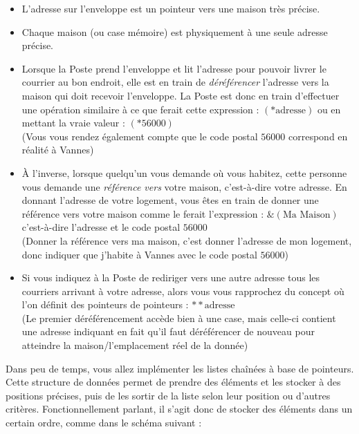 \documentclass[11pt,a4paper]{article}
\begin{document}
\begin{itemize}
\item L'adresse sur l'enveloppe est un pointeur vers une maison très précise. \\

\item Chaque maison (ou case mémoire) est physiquement à une seule adresse précise. \\

\item Lorsque la Poste prend l'enveloppe et lit l'adresse pour pouvoir livrer le courrier au bon endroit, elle est en train de \textit{déréférencer} l'adresse vers la maison qui doit recevoir l'enveloppe.
La Poste est donc en train d'effectuer une opération similaire à ce que ferait cette expression : \underline{$ (*\text{adresse}) $} ou en mettant la vraie valeur : \underline{$ (*56000) $} \\
(Vous vous rendez également compte que le code postal $ 56000 $ correspond en réalité à Vannes) \\

\item À l'inverse, lorsque quelqu'un vous demande où vous habitez, cette personne vous demande une \textit{référence vers} votre maison, c'est-à-dire votre adresse.
En donnant l'adresse de votre logement, vous êtes en train de donner une référence vers votre maison comme le ferait l'expression : \underline{$ \&(\text{Ma Maison}) $} c'est-à-dire l'adresse et le code postal \underline{$ 56000 $} \\
(Donner la référence vers ma maison, c'est donner l'adresse de mon logement, donc indiquer que j'habite à Vannes avec le code postal $ 56000 $) \\

\item Si vous indiquez à la Poste de rediriger vers une autre adresse tous les courriers arrivant à votre adresse, alors vous vous rapprochez du concept où l'on définit des pointeurs de pointeurs : \underline{$ **\text{adresse} $} \\
(Le premier déréférencement accède bien à une case, mais celle-ci contient une adresse indiquant en fait qu'il faut déréférencer de nouveau pour atteindre la maison/l'emplacement réel de la donnée) \\
\end{itemize}


\vfillLast
\pagebreak

Dans peu de temps, vous allez implémenter les listes chaînées à base de pointeurs.
Cette structure de données permet de prendre des éléments et les stocker à des positions précises, puis de les sortir de la liste selon leur position ou d'autres critères.
Fonctionnellement parlant, il s'agit donc de stocker des éléments dans un certain ordre, comme dans le schéma suivant :
\end{document}
